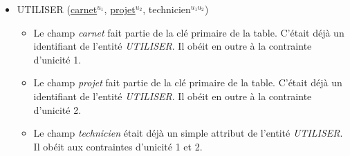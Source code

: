 \documentclass[a4paper]{article}
\newcommand{\relat}[1]{\textsc{#1}}
\newcommand{\attr}[1]{#1}
\newcommand{\prim}[1]{\uline{#1}}
\begin{document}
\begin{itemize}
  \item \relat{UTILISER} (\prim{carnet}$^{u_1}$, \prim{projet}$^{u_2}$, \attr{technicien}$^{u_1 u_2}$)
  \begin{itemize}
    \item Le champ \emph{carnet} fait partie de la clé primaire de la table. C'était déjà un identifiant de l'entité \emph{UTILISER}. Il obéit en outre à la contrainte d'unicité 1.
    \item Le champ \emph{projet} fait partie de la clé primaire de la table. C'était déjà un identifiant de l'entité \emph{UTILISER}. Il obéit en outre à la contrainte d'unicité 2.
    \item Le champ \emph{technicien} était déjà un simple attribut de l'entité \emph{UTILISER}. Il obéit aux contraintes d'unicité 1 et 2.
  \end{itemize}

\end{itemize}
\end{document}
